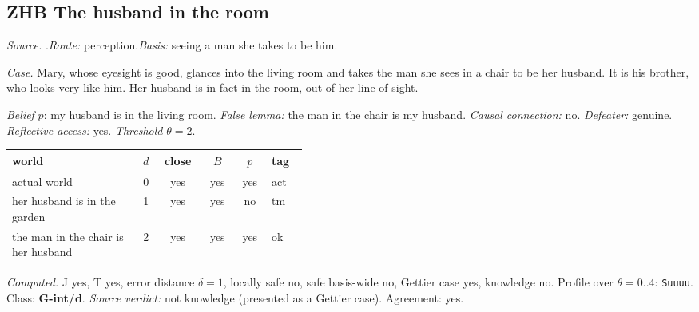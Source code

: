 \subsection*{ZHB \enspace The husband in the room}
\noindent\textit{Source.} \citet{Zagzebski1994}.\quad \textit{Route:} perception.\quad \textit{Basis:} seeing a man she takes to be him.\par
\noindent\textit{Case.} Mary, whose eyesight is good, glances into the living room and takes the man she sees in a chair to be her husband. It is his brother, who looks very like him. Her husband is in fact in the room, out of her line of sight.\par
\noindent\textit{Belief} $p$: my husband is in the living room.
 \textit{False lemma:} the man in the chair is my husband. \textit{Causal connection:} no. \textit{Defeater:} genuine. \textit{Reflective access:} yes. \textit{Threshold} $\theta = 2$.\par
\begin{center}\begin{tabular}{@{}p{0.43\linewidth}rcccl@{}}
world & $d$ & close & $B$ & $p$ & tag \\ \midrule
actual world & 0 & yes & yes & yes & act \\
her husband is in the garden & 1 & yes & yes & no & tm \\
the man in the chair is her husband & 2 & yes & yes & yes & ok \\
\end{tabular}\end{center}
\noindent\textit{Computed.} J yes, T yes, error distance $\delta = 1$, locally safe no, safe basis-wide no, Gettier case yes, knowledge no. Profile over $\theta = 0..4$: \texttt{Suuuu}. Class: \textbf{G-int/d}.
 \textit{Source verdict:} not knowledge (presented as a Gettier case). Agreement: yes.
\par\medskip
{}
